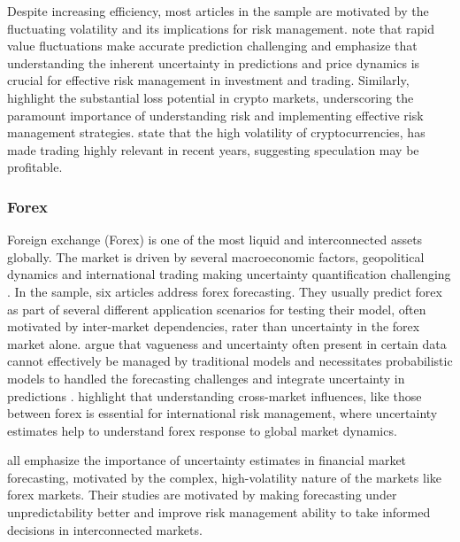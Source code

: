 Despite increasing efficiency, most articles in the sample are motivated by the fluctuating volatility and its implications for risk management. \textcite{Golnari2024Cryptocurrency} note that rapid value fluctuations make accurate prediction challenging and emphasize that understanding the inherent uncertainty in predictions and price dynamics is crucial for effective risk management in investment and trading. Similarly, 
\textcite{Almeida2024RiskForecasting} highlight the substantial loss potential in crypto markets, underscoring the paramount importance of understanding risk and implementing effective risk management strategies. \textcite{cocco2021predictions} state that the high volatility of cryptocurrencies, has made trading highly relevant in recent years, suggesting speculation may be profitable. 


\subsubsection{Forex}
Foreign exchange (Forex) is one of the most liquid and interconnected assets globally. The market is driven by several macroeconomic factors, geopolitical dynamics and international trading making uncertainty quantification challenging \parencite{Rossi2013ExchangeRP}.
In the sample, six articles address forex forecasting. They usually predict forex as part of several different application scenarios for testing their model, often motivated by inter-market dependencies, rater than uncertainty in the forex market alone. 
\textcite{li2010stochastic} argue that vagueness and uncertainty often present in certain data cannot effectively be managed by traditional models and necessitates probabilistic models to handled the forecasting challenges and integrate uncertainty in predictions \parencite{Moller2007Uncertainty, li2010stochastic}. 
\textcite{cao2019multi} highlight that understanding cross-market influences, like those between forex is essential for international risk management, where uncertainty estimates help to understand forex response to global market dynamics.  

\textcite{Papaioannou2022gpr, Platanios2014gpr, 
tang2024period} all emphasize the importance of uncertainty estimates in financial market forecasting, motivated by the complex, high-volatility nature of the markets like forex markets. Their studies are motivated by making forecasting under unpredictability better and improve risk management ability to take informed decisions in interconnected markets.  


